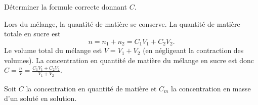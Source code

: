 


\begin{enonce}
Déterminer la formule correcte donnant $C$.

\end{enonce}


\begin{corrigeNewpage}
Lors du mélange, la quantité de matière se conserve. La quantité de matière totale en sucre est 
\[
n=n_1+n_2=C_1V_1+C_2V_2.
\]
Le volume total du mélange est $V=V_1+V_2$ (en négligeant la contraction des volumes). La concentration en quantité de matière du mélange en sucre est donc $C=\frac{n}{V}=\frac{C_1V_1+C_2V_2}{V_1+V_2}$.
\end{corrigeNewpage}


\finEntrainement










\hauteurLargeurCadreReponse		{7mm}{4cm}
\typeEntrainement				{} %
\initialisationEntrainement


\debutEntrainement

Soit $C$ la concentration en quantité de matière et $C_m$ la concentration en masse d'un soluté en solution. 

